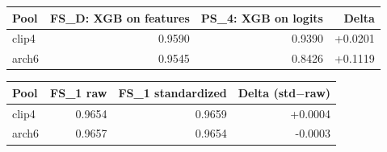 \begin{tabular}{lrrr}
\toprule
Pool & FS\_D: XGB on features & PS\_4: XGB on logits & Delta \\
\midrule
clip4 & 0.9590 & 0.9390 & +0.0201 \\
arch6 & 0.9545 & 0.8426 & +0.1119 \\
\bottomrule
\end{tabular}

\begin{tabular}{lrrr}
\toprule
Pool & FS\_1 raw & FS\_1 standardized & Delta (std$-$raw) \\
\midrule
clip4 & 0.9654 & 0.9659 & +0.0004 \\
arch6 & 0.9657 & 0.9654 & -0.0003 \\
\bottomrule
\end{tabular}